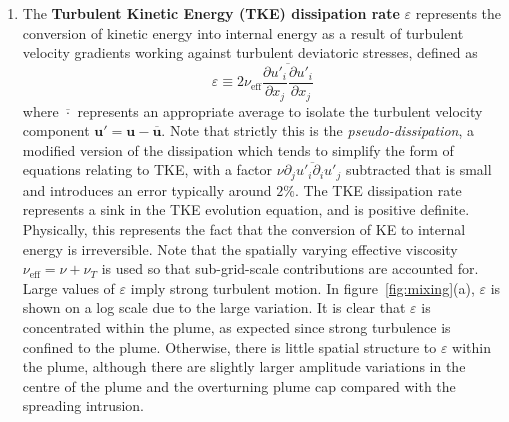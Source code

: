 \documentclass[a4paper]{article}
\begin{document}
\begin{enumerate}[label=(\alph*)]
	\item The \textbf{Turbulent Kinetic Energy (TKE) dissipation rate} $\varepsilon$ represents the conversion
		of kinetic energy into internal energy as a result of turbulent velocity gradients working against
		turbulent deviatoric stresses, defined as
		\begin{equation}
			\varepsilon \equiv 2\nu_{\text{eff}} \overline{\frac{\partial u'_i}{\partial x_j} \frac{\partial
					u'_i}{\partial x_j}}
		\end{equation}
		where $\overline{\cdot}$ represents an appropriate average to isolate the turbulent velocity component
		$\bm{u}' = \bm{u}-\overline{\bm{u}}$. Note that strictly this is the \emph{pseudo-dissipation}, a
		modified version of the dissipation which tends to simplify the form of equations relating to TKE,
		with a factor $\nu \overline{\partial_j u'_i \partial_i u'_j}$ subtracted that is small and introduces
		an error typically around $2\%$. The TKE dissipation rate represents a sink in the TKE evolution
		equation, and is positive definite.  Physically, this represents the fact that the conversion of KE to
		internal energy is irreversible.  Note that the spatially varying effective viscosity
		$\nu_{\text{eff}} = \nu + \nu_T$ is used so that sub-grid-scale contributions are accounted for. Large
		values of $\varepsilon$ imply strong turbulent motion. In figure~\ref{fig:mixing}(a), $\varepsilon$ is
		shown on a log scale due to the large variation.  It is clear that $\varepsilon$ is concentrated
		within the plume, as expected since strong turbulence is confined to the plume.  Otherwise, there is
		little spatial structure to $\varepsilon$ within the plume, although there are slightly larger
		amplitude variations in the centre of the plume and the overturning plume cap compared with the
		spreading intrusion.


\end{enumerate}
\end{document}

